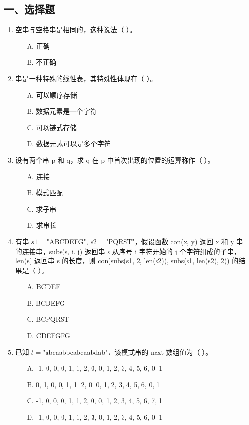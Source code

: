 \documentclass[12pt, a4paper]{article}
\begin{document}
\subsection*{一、选择题}
\begin{enumerate}
    \item 空串与空格串是相同的，这种说法（ ）。
    \begin{enumerate}
        \item[A.] 正确
        \item[B.] 不正确
    \end{enumerate}
    
    \item 串是一种特殊的线性表，其特殊性体现在（ ）。
    \begin{enumerate}
        \item[A.] 可以顺序存储
        \item[B.] 数据元素是一个字符
        \item[C.] 可以链式存储
        \item[D.] 数据元素可以是多个字符
    \end{enumerate}
    
    \item 设有两个串 p 和 q，求 q 在 p 中首次出现的位置的运算称作（ ）。
    \begin{enumerate}
        \item[A.] 连接
        \item[B.] 模式匹配
        \item[C.] 求子串
        \item[D.] 求串长
    \end{enumerate}
    
    \item 有串 $s1=$"ABCDEFG", $s2=$"PQRST"，假设函数 con(x, y) 返回 x 和 y 串的连接串，subs(s, i, j) 返回串 s 从序号 i 字符开始的 j 个字符组成的子串，len(s) 返回串 s 的长度，则 con(subs(s1, 2, len(s2)), subs(s1, len(s2), 2)) 的结果是（ ）。
    \begin{enumerate}
        \item[A.] BCDEF
        \item[B.] BCDEFG
        \item[C.] BCPQRST
        \item[D.] CDEFGFG
    \end{enumerate}
    
    \item 已知 $t=$"abcaabbcabcaabdab"，该模式串的 next 数组值为（ ）。
    \begin{enumerate}
        \item[A.] -1, 0, 0, 0, 1, 1, 2, 0, 0, 1, 2, 3, 4, 5, 6, 0, 1
        \item[B.] 0, 1, 0, 0, 1, 1, 2, 0, 0, 1, 2, 3, 4, 5, 6, 0, 1
        \item[C.] -1, 0, 0, 0, 1, 1, 2, 0, 0, 1, 2, 3, 4, 5, 6, 7, 1
        \item[D.] -1, 0, 0, 0, 1, 1, 2, 3, 0, 1, 2, 3, 4, 5, 6, 0, 1
    \end{enumerate}
    

\end{enumerate}
\end{document}
